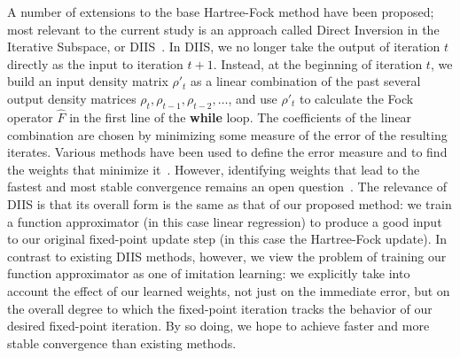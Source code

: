 \documentclass[twoside,11pt]{article}
\begin{document}
A number of extensions to the base Hartree-Fock method have been proposed; most relevant to the current study is an approach called Direct Inversion in the Iterative Subspace, or DIIS~\citep{Pulay1980}. In DIIS, we no longer take the output of iteration $t$ directly as the input to iteration $t+1$.  Instead, at the beginning of iteration $t$, we build an input density matrix $\rho'_{t}$ as a linear combination of the past several output density matrices $\rho_t, \rho_{t-1}, \rho_{t-2}, \ldots$, and use $\rho'_{t}$ to calculate the Fock operator $\hat F$ in the first line of the \textbf{while} loop.  The coefficients of the linear combination are chosen by minimizing some measure of the error of the resulting iterates.  Various methods have been used to define the error measure and to find the weights that minimize it~\citep{ADIIS,compScuseria,Alejandro2012}. However, identifying weights that lead to the fastest and most stable convergence remains an open question~\citep{Konstantin2002, Thorsten2011}.
The relevance of DIIS is that its overall form is the same as that of our proposed method: we train a function approximator (in this case linear regression) to produce a good input to our original fixed-point update step (in this case the Hartree-Fock update).  In contrast to existing DIIS methods, however, we view the problem of training our function approximator as one of imitation learning: we explicitly take into account the effect of our learned weights, not just on the immediate error, but on the overall degree to which the fixed-point iteration tracks the behavior of our desired fixed-point iteration.  By so doing, we hope to achieve faster and more stable convergence than existing methods.


\end{document}
